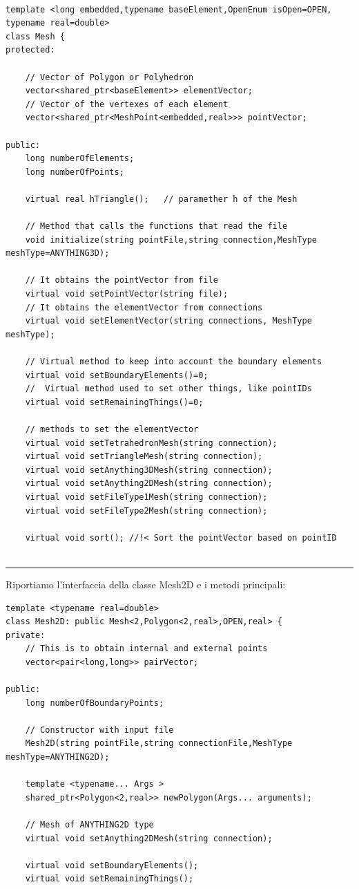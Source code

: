 \documentclass[oneside,12pt]{book}  %
\theoremstyle{plain}
\theoremstyle{definition}
\theoremstyle{remark}
\numberwithin{equation}{chapter} %
\begin{document}
\begin{verbatim}

template <long embedded,typename baseElement,OpenEnum isOpen=OPEN,
typename real=double>
class Mesh {
protected:
    
    // Vector of Polygon or Polyhedron
    vector<shared_ptr<baseElement>> elementVector;	
    // Vector of the vertexes of each element
    vector<shared_ptr<MeshPoint<embedded,real>>> pointVector;	
	
public:
    long numberOfElements;
    long numberOfPoints;

    virtual real hTriangle();	// paramether h of the Mesh
	
    // Method that calls the functions that read the file
    void initialize(string pointFile,string connection,MeshType meshType=ANYTHING3D);

    // It obtains the pointVector from file
    virtual void setPointVector(string file);	
    // It obtains the elementVector from connections
    virtual void setElementVector(string connections, MeshType meshType);
    
    // Virtual method to keep into account the boundary elements
    virtual void setBoundaryElements()=0;
    //	Virtual method used to set other things, like pointIDs
    virtual void setRemainingThings()=0;

    // methods to set the elementVector
    virtual void setTetrahedronMesh(string connection); 
    virtual void setTriangleMesh(string connection);	
    virtual void setAnything3DMesh(string connection);
    virtual void setAnything2DMesh(string connection);
    virtual void setFileType1Mesh(string connection);
    virtual void setFileType2Mesh(string connection);

    virtual void sort(); //!< Sort the pointVector based on pointID


\end{verbatim}

\noindent\rule{14cm}{1pt}

Riportiamo l'interfaccia della classe Mesh2D e i metodi principali:

\begin{verbatim}
template <typename real=double>
class Mesh2D: public Mesh<2,Polygon<2,real>,OPEN,real> {
private:
    // This is to obtain internal and external points	
    vector<pair<long,long>> pairVector;

public:
    long numberOfBoundaryPoints;
	
    // Constructor with input file
    Mesh2D(string pointFile,string connectionFile,MeshType meshType=ANYTHING2D);

    template <typename... Args >
    shared_ptr<Polygon<2,real>> newPolygon(Args... arguments);

    // Mesh of ANYTHING2D type
    virtual void setAnything2DMesh(string connection);

    virtual void setBoundaryElements();
    virtual void setRemainingThings();
\end{verbatim}
\end{document}
